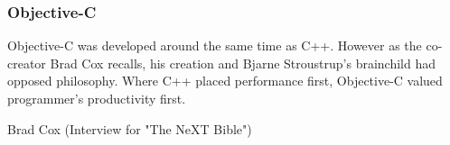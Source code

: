 \par
\subsubsection{Objective-C}
Objective-C was developed around the same time as C++. However as the co-creator Brad Cox recalls, his creation and Bjarne Stroustrup's brainchild had opposed philosophy. Where C++ placed performance first, Objective-C valued programmer's productivity first.\\
\par
{} {Brad Cox (Interview for "The NeXT Bible")}\\
\par



